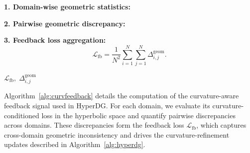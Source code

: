 \documentclass[10pt]{article} %
\begin{document}
\begin{algorithm}[t]
\caption{\textbf{Curvature-Aware Geometric Feedback Computation in HyperDG}}
\label{alg:curvfeedback}



\BlankLine

\textbf{1. Domain-wise geometric statistics:} \\

\BlankLine

\textbf{2. Pairwise geometric discrepancy:}\\

\BlankLine

\textbf{3. Feedback loss aggregation:}\\
\[
\mathcal{L}_{\mathrm{fb}}
=
\frac{1}{N^2}
\sum_{i=1}^{N}\sum_{j=1}^{N}
\Delta^{\mathrm{geom}}_{i,j}.
\]

\BlankLine
\Return $\mathcal{L}_{\mathrm{fb}},\;\Delta^{\mathrm{geom}}_{i,j}$\;

\end{algorithm}



Algorithm~\ref{alg:curvfeedback} details the computation of the 
curvature-aware feedback signal used in HyperDG. For each domain, 
we evaluate its curvature-conditioned loss in the hyperbolic space 
and quantify pairwise discrepancies across domains. These 
discrepancies form the feedback loss $\mathcal{L}_{\mathrm{fb}}$, 
which captures cross-domain geometric inconsistency and drives the 
curvature-refinement updates described in Algorithm~\ref{alg:hyperdg}. 
\end{document}
